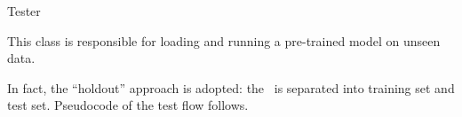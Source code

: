 \begin{subsection}{Tester}
    \par This class is responsible for loading and running a pre-trained model on unseen data.
    \par In fact, the ``holdout'' approach is adopted: the~ is separated into training set and test set. Pseudocode of the test flow follows.
    
\end{subsection}
